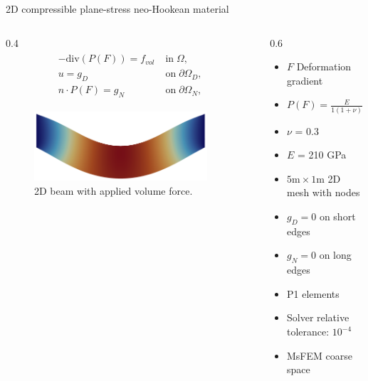 \begin{frame}[noframenumbering]{2D compressible plane-stress neo-Hookean material}
	\vspace{0mm}
	\begin{columns}
		\begin{column}{0.4\textwidth}%
			\begin{align*}
				\label{eq:nonlinelas}
				\begin{split}
					-\mathrm{div}(P(F)) = f_{vol}\; & \mathrm{in}\;\Omega,           \\
					u = g_D \;                      & \mathrm{on}\;\partial\Omega_D, \\
					n\cdot P(F) = g_N\;             & \mathrm{on}\;\partial\Omega_N,
				\end{split}
			\end{align*}
			\begin{figure}
				\centering
				\includegraphics[width=0.9\textwidth]{images/beam2D.png}
				\caption{2D beam with applied volume force.}
				\label{fig:beam2d}
			\end{figure}
		\end{column}%
		\begin{column}{0.6\textwidth}
			\vspace{-1em}
			\centering
			\begin{itemize}
				\item $F$ Deformation gradient
				\item $P(F) = \frac{E}{1(1+\nu)}(F-F^{-T}) + \frac{E\nu}{(1+\nu)(1-2\nu)}\mathrm{ln}(\mathrm{det}(F)F^{-T})$
				\item $\nu$ = 0.3
				\item $E$ = 210 GPa
				\item $5\textrm{m}\times 1\textrm{m}$ 2D mesh with  nodes
        \item $g_D = 0$ on short edges
				\item $g_N = 0$ on long edges
				\item P1 elements
        \item Solver relative tolerance: $10^{-4}$
        \item MsFEM coarse space \footnotemark{}
			\end{itemize}
		\end{column}
	\end{columns}
\end{frame}

